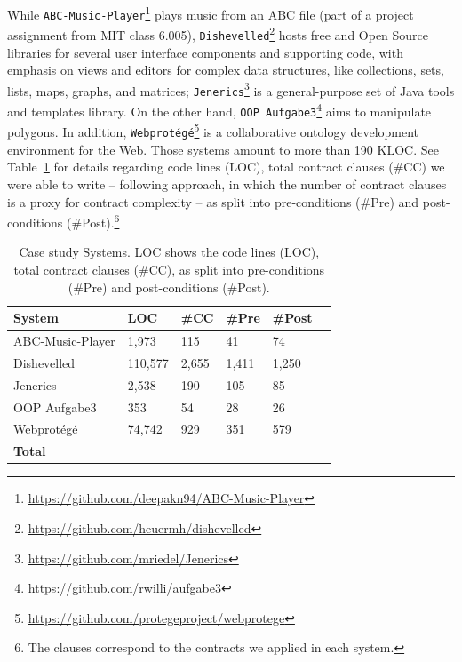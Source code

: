 While \texttt{ABC-Music-Player}\footnote{\url{https://github.com/deepakn94/ABC-Music-Player}}
plays music from an ABC file (part of a project assignment from MIT class
6.005), \texttt{Dishevelled}\footnote{\url{https://github.com/heuermh/dishevelled}} hosts
free and Open Source libraries for several user interface components and
supporting code, with emphasis on views and editors for complex data structures, like collections, sets, lists, maps, graphs, and
matrices; \texttt{Jenerics}\footnote{\url{https://github.com/mriedel/Jenerics}} is a general-purpose set of Java tools and templates library.
On the other hand, \texttt{OOP
Aufgabe3}\footnote{\url{https://github.com/rwilli/aufgabe3}} aims to manipulate
polygons. In addition,
\texttt{Webprot\'{e}g\'{e}}\footnote{\url{https://github.com/protegeproject/webprotege}}
is a collaborative ontology development environment for the Web. Those systems amount to more than 190 KLOC. See Table~\ref{tab:Units} for details regarding code lines (LOC), total contract clauses (\#CC) we were able to write
-- following \cite{Estler-etal14} approach, in which the number of contract clauses is a proxy for contract complexity -- as split
into pre-conditions (\#Pre) and post-conditions (\#Post).\footnote{The clauses
correspond to the contracts we applied in each system.}

\begin{table}[ht]
\caption{Case study Systems. LOC shows the code lines (LOC), total contract clauses (\#CC), as split
into pre-conditions (\#Pre) and post-conditions (\#Post).}
\label{tab:Units}
\centering
\begin{tabular}{llllll}
\toprule
\bfseries System &  \bfseries LOC & 
\bfseries \#CC &  \bfseries \#Pre &  \bfseries \#Post \\ \hline
ABC-Music-Player & 1,973 & 115 & 41 & 74 \\ 
Dishevelled & 110,577 & 2,655 & 1,411 & 1,250\\ 
Jenerics & 2,538 & 190 & 105 & 85 \\ 
OOP Aufgabe3 & 353 & 54 & 28 & 26 \\
Webprot\'{e}g\'{e} & 74,742 & 929 & 351 & 579 \\ \hline

 \bfseries Total &  \bfseries \totalCode{} &  \bfseries
\totalClauses{} &  \bfseries \totalPre{} &  \bfseries \totalPost{}
\\
\bottomrule
\end{tabular}
\end{table}

